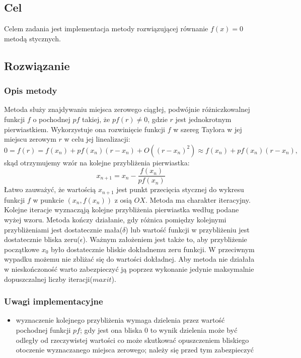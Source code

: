 \documentclass{article}
\begin{document}
\subsection{Cel}
Celem zadania jest implementacja metody rozwiązującej równanie $f(x) = 0$ metodą stycznych.

\subsection{Rozwiązanie}
\subsubsection{Opis metody}
Metoda służy znajdywaniu miejsca zerowego ciągłej, podwójnie różniczkowalnej funkcji $f$ o pochodnej $pf$
takiej, że $pf(r) \ne 0$, gdzie $r$ jest jednokrotnym pierwiastkiem. Wykorzystuje ona rozwinięcie funkcji $f$ w szereg Taylora 
w jej miejscu zerowym $r$ w celu jej linealizacji:
\[ 0 = f(r) = f(x_n) + pf(x_n)(r - x_n) + O((r-x_n)^2) \approx f(x_n) + pf(x_n)(r - x_n), \] 
skąd otrzymujemy wzór na kolejne przybliżenia pierwiastka:
\[ x_{n+1} = x_n - \frac{f(x_n)}{pf(x_n)} \]
Łatwo zauważyć, że wartością $x_{n+1}$ jest punkt przecięcia stycznej do wykresu funkcji $f$ w punkcie $(x_n, f(x_n))$ z osią $OX$.
Metoda ma charakter iteracyjny. Kolejne iteracje wyznacząją kolejne przybliżenia pierwiastka według podane wyżej wzoru.
Metoda kończy działanie, gdy różnica pomiędzy kolejnymi przybliżeniami jest dostatecznie mała($\delta$) lub wartość funkcji w przybliżeniu jest dostatecznie bliska zeru($\epsilon$). 
Ważnym założeniem jest także to, aby przybliżenie początkowe $x_0$ było dostatecznie bliskie dokładnemu zeru funkcji. W przeciwnym wypadku możemu nie zbliżać się do wartości dokładnej.
Aby metoda nie działała w nieskończoność warto zabezpieczyć ją poprzez wykonanie jedynie maksymalnie dopuszczalnej liczby iteracji($maxit$).

\subsubsection{Uwagi implementacyjne}
\begin{itemize}
    \item wyznaczenie kolejnego przybliżenia wymaga dzielenia przez wartość pochodnej funkcji $pf$; gdy jest ona bliska $0$ to wynik dzielenia może być odległy od rzeczywistej wartości 
    co może skutkować opuszczeniem bliskiego otoczenie wyznaczanego miejsca zerowego; należy się przed tym zabezpieczyć
\end{itemize}
\end{document}
